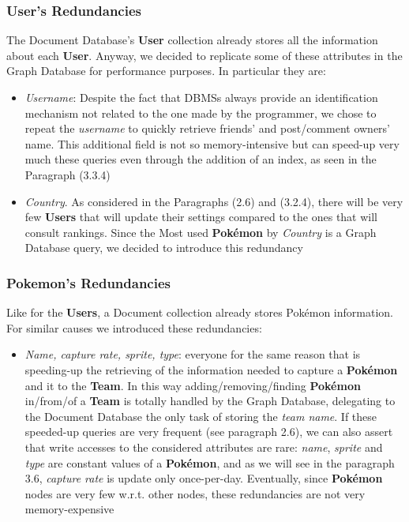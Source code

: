 \subsubsection{User's Redundancies}
The Document Database’s \textbf{User} collection already stores all the information about each \textbf{User}. Anyway, we decided to replicate some of these attributes in the Graph Database for performance purposes. In particular they are:

\begin{itemize}
	\item \textit{Username}: Despite the fact that DBMSs always provide an identification mechanism not related to the one made by the programmer, we chose to repeat the \textit{username} to quickly retrieve friends’ and post/comment owners’ name. 
	This additional field is not so memory-intensive but can speed-up very much these queries even through the addition of an index, as seen in the Paragraph (3.3.4) 
	\item \textit{Country}. As considered in the Paragraphs (2.6) and (3.2.4), there will be very few \textbf{Users} that will update their settings compared to the ones that will consult rankings. Since the Most used \textbf{Pokémon} by \textit{Country} is a Graph Database query, we decided to introduce this redundancy
\end{itemize}

\subsubsection{Pokemon's Redundancies}
Like for the \textbf{Users}, a Document collection already stores Pokémon information. For similar causes we introduced these redundancies:
\begin{itemize}
	\item \textit{Name, capture rate, sprite, type}: everyone for the same reason that is speeding-up the retrieving of the information needed to capture a \textbf{Pokémon} and it to the \textbf{Team}. In this way adding/removing/finding \textbf{Pokémon} in/from/of a \textbf{Team} is totally handled by the Graph Database, delegating to the Document Database the only task of storing the \textit{team name}. 
	If these speeded-up queries are very frequent (see paragraph 2.6), we can also assert that write accesses to the considered attributes are rare: \textit{name}, \textit{sprite} and \textit{type} are constant values of a \textbf{Pokémon}, and as we will see in the paragraph 3.6, \textit{capture rate} is update only once-per-day.
	Eventually, since \textbf{Pokémon} nodes are very few w.r.t. other nodes, these redundancies are not very memory-expensive
\end{itemize}

